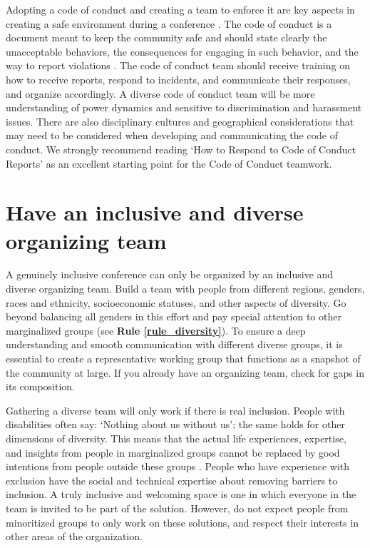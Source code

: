 \documentclass[10pt,letterpaper]{article}
\begin{document}
Adopting a code of conduct and creating a team to enforce it are key aspects in creating a safe environment during a conference \cite{favaroYourScienceConference2016}.
The code of conduct is a document meant to keep the community safe and should state clearly the unacceptable behaviors, the consequences for engaging in such behavior, and the way to report violations \cite{auroraHowRespondCode2019}. 
The code of conduct team should receive training on how to receive reports, respond to incidents, and communicate their responses, and organize accordingly. 
A diverse code of conduct team will be more understanding of power dynamics and sensitive to discrimination and harassment issues. 
There are also disciplinary cultures and geographical considerations that may need to be considered when developing and communicating the code of conduct. 
We strongly recommend reading `How to Respond to Code of Conduct Reports' \cite{auroraHowRespondCode2019} as an excellent starting point for the Code of Conduct teamwork.


\section{Have an inclusive and diverse organizing team}
\label{rule_organizing_team}

A genuinely inclusive conference can only be organized by an inclusive and diverse organizing team.
Build a team with people from different regions, genders, races and ethnicity, socioeconomic statuses, and other aspects of diversity. 
Go beyond balancing all genders in this effort and pay special attention to other marginalized groups (see \textbf{Rule \ref{rule_diversity}}). 
To ensure a deep understanding and smooth communication with different diverse groups, it is essential to create a representative working group that functions as a snapshot of the community at large. 
If you already have an organizing team, check for gaps in its composition. 

Gathering a diverse team will only work if there is real inclusion. 
People with disabilities often say: `Nothing about us without us'; the same holds for other dimensions of diversity. 
This means that the actual life experiences, expertise, and insights from people in marginalized groups cannot be replaced by good intentions from people outside these groups \cite{costanzachockDesign2020}.
People who have experience with exclusion have the social and technical expertise about removing barriers to inclusion.
A truly inclusive and welcoming space is one in which everyone in the team is invited to be part of the solution.
However, do not expect people from minoritized groups to only work on these solutions, and respect their interests in other areas of the organization. 
\end{document}
